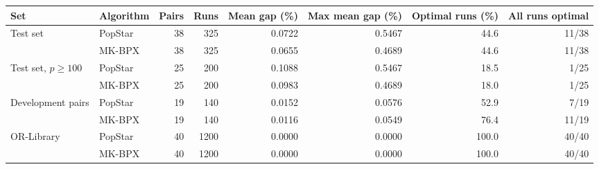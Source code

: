 \begin{tabular}{llrrrrrr}
\toprule
Set & Algorithm & Pairs & Runs & Mean gap (\%) & Max mean gap (\%) & Optimal runs (\%) & All runs optimal \\
\midrule
Test set & PopStar & 38 & 325 & 0.0722 & 0.5467 & 44.6 & 11/38 \\
 & MK-BPX & 38 & 325 & 0.0655 & 0.4689 & 44.6 & 11/38 \\
\midrule
Test set, $p\geq 100$ & PopStar & 25 & 200 & 0.1088 & 0.5467 & 18.5 & 1/25 \\
 & MK-BPX & 25 & 200 & 0.0983 & 0.4689 & 18.0 & 1/25 \\
\midrule
Development pairs & PopStar & 19 & 140 & 0.0152 & 0.0576 & 52.9 & 7/19 \\
 & MK-BPX & 19 & 140 & 0.0116 & 0.0549 & 76.4 & 11/19 \\
\midrule
OR-Library & PopStar & 40 & 1200 & 0.0000 & 0.0000 & 100.0 & 40/40 \\
 & MK-BPX & 40 & 1200 & 0.0000 & 0.0000 & 100.0 & 40/40 \\
\bottomrule
\end{tabular}